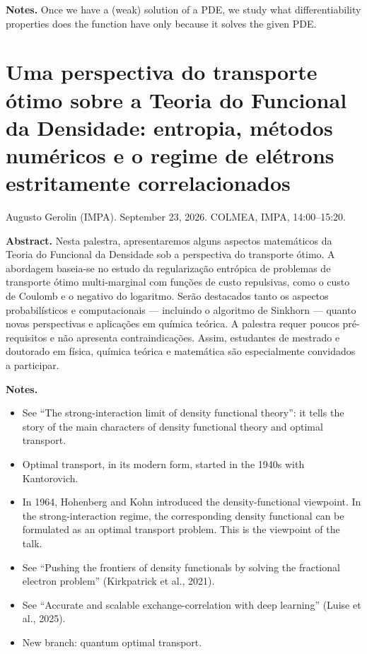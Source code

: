 \medskip\noindent
{\bf Notes.} Once we have a (weak) solution
of a PDE, we study what differentiability 
properties does the function have only
because it solves the given PDE.


\section{Uma perspectiva do transporte
ótimo sobre a Teoria do Funcional da
Densidade: entropia, métodos numéricos e o
regime de elétrons estritamente
correlacionados}
\label{section-gerolin-colmea-2026}

\noindent
Augusto Gerolin (IMPA).
September 23, 2026.
COLMEA, IMPA, 14:00--15:20.

\medskip\noindent
{\bf Abstract.}
Nesta palestra, apresentaremos alguns
aspectos matemáticos da Teoria do Funcional
da Densidade sob a perspectiva do transporte
ótimo. A abordagem baseia-se no estudo da
regularização entrópica de problemas de
transporte ótimo multi-marginal com funções
de custo repulsivas, como o custo de Coulomb
e o negativo do logaritmo. Serão destacados
tanto os aspectos probabilísticos e
computacionais --- incluindo o algoritmo de
Sinkhorn --- quanto novas perspectivas e
aplicações em química teórica. A palestra
requer poucos pré-requisitos e não apresenta
contraindicações. Assim, estudantes de
mestrado e doutorado em física, química
teórica e matemática são especialmente
convidados a participar.

\medskip\noindent
{\bf Notes.}
\begin{itemize}
\item
See ``The strong-interaction limit of
density functional theory'': it tells the
story of the main characters of density
functional theory and optimal transport.

\item
Optimal transport, in its modern form,
started in the 1940s with Kantorovich.

\item
In 1964, Hohenberg and Kohn introduced the
density-functional viewpoint. In the
strong-interaction regime, the corresponding
density functional can be formulated as an
optimal transport problem. This is the
viewpoint of the talk.
\item
See ``Pushing the frontiers of density
functionals by solving the fractional
electron problem'' (Kirkpatrick et al.,
2021).

\item
See ``Accurate and scalable
exchange-correlation with deep learning''
(Luise et al., 2025).
\item
New branch: quantum optimal transport.
\end{itemize}

